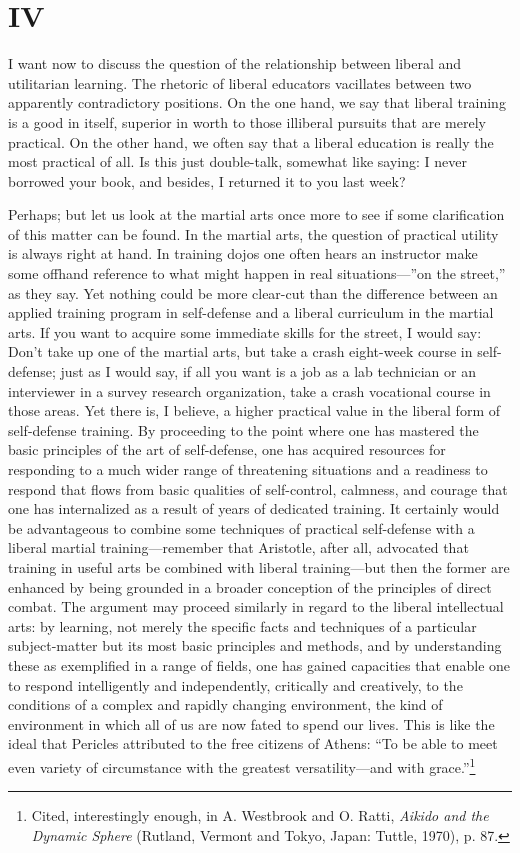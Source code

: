 \section*{IV}

I want now to discuss the question of the relationship between liberal and utilitarian learning. The rhetoric of liberal educators vacillates between two apparently contradictory positions. On the one hand, we say that liberal training is a good in itself, superior in worth to those illiberal pursuits that are merely practical. On the other hand, we often say that a liberal education is really the most practical of all. Is this just double-talk, somewhat like saying: I never borrowed your book, and besides, I returned it to you last week?  

Perhaps; but let us look at the martial arts once more to see if some clarification of this matter can be found. In the martial arts, the question of practical utility is always right at hand. In training dojos one often hears an instructor make some offhand reference to what might happen in real situations---''on the street,'' as they say. Yet nothing could be more clear-cut than the difference between an applied training program in self-defense and a liberal curriculum in the martial arts. If you want to acquire some immediate skills for the street, I would say: Don't take up one of the martial arts, but take a crash eight-week course in self-defense; just as I would say, if all you want is a job as a lab technician or an interviewer in a survey research organization, take a crash vocational course in those areas. Yet there is, I believe, a higher practical value in the liberal form of self-defense training. By proceeding to the point where one has mastered the basic principles of the art of self-defense, one has acquired resources for responding to a much wider range of threatening situations and a readiness to respond that flows from basic qualities of self-control, calmness, and courage that one has internalized as a result of years of dedicated training. It certainly would be advantageous to combine some techniques of practical self-defense with a liberal martial training---remember that Aristotle, after all, advocated that training in useful arts be combined with liberal training---but then the former are enhanced by being grounded in a broader conception of the principles of direct combat. The argument may proceed similarly in regard to the liberal intellectual arts: by learning, not merely the specific facts and techniques of a particular subject-matter but its most basic principles and methods, and by understanding these as exemplified in a range of fields, one has gained capacities that enable one to respond intelligently and independently, critically and creatively, to the conditions of a complex and rapidly changing environment, the kind of environment in which all of us are now fated to spend our lives. This is like the ideal that Pericles attributed to the free citizens of Athens: ``To be able to meet even variety of circumstance with the greatest versatility---and with grace.''\footnote{Cited, interestingly enough, in A. Westbrook and O. Ratti, \emph{Aikido and the Dynamic Sphere} (Rutland, Vermont and Tokyo, Japan: Tuttle, 1970), p. 87.}

